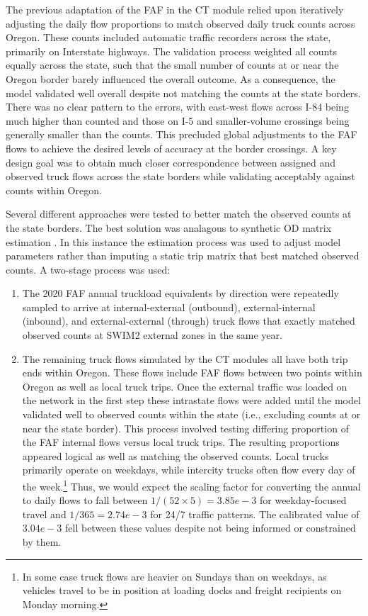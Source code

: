 The previous adaptation of the FAF in the CT module relied upon iteratively adjusting the daily flow proportions to match observed daily truck counts across Oregon. These counts included automatic traffic recorders across the state, primarily on Interstate highways. The validation process weighted all counts equally across the state, such that the small number of counts at or near the Oregon border barely influenced the overall outcome. As a consequence, the model validated well overall despite not matching the counts at the state borders. There was no clear pattern to the errors, with east-west flows across I-84 being much higher than counted and those on I-5 and smaller-volume crossings being generally smaller than the counts. This precluded global adjustments to the FAF flows to achieve the desired levels of accuracy at the border crossings. A key design goal was to obtain much closer correspondence between assigned and observed truck flows across the state borders while validating acceptably against counts within Oregon.

Several different approaches were tested to better match the observed counts at the state borders. The best solution was analagous to synthetic OD matrix estimation \citep{list02, kalahasthi22}. In this instance the estimation process was used to adjust model parameters rather than imputing a static trip matrix that best matched observed counts. A two-stage process was used:
\begin{enumerate}
    \item The 2020 FAF annual truckload equivalents by direction were repeatedly sampled to arrive at internal-external (outbound), external-internal (inbound), and external-external (through) truck flows that exactly matched observed counts at SWIM2 external zones in the same year.
    \item The remaining truck flows simulated by the CT modules all have both trip ends within Oregon. These flows include FAF flows between two points within Oregon as well as local truck trips. Once the external traffic was loaded on the network in the first step these intrastate flows were added until the model validated well to observed counts within the state (i.e., excluding counts at or near the state border). This process involved testing differing proportion of the FAF internal flows versus local truck trips. The resulting proportions appeared logical as well as matching the observed counts. Local trucks primarily operate on weekdays, while intercity trucks often flow every day of the week.\footnote{In some case truck flows are heavier on Sundays than on weekdays, as vehicles travel to be in position at loading docks and freight recipients on Monday morning.} Thus, we would expect the scaling factor for converting the annual to daily flows to fall between $1/(52 \times 5) = 3.85e-3$ for weekday-focused travel and $1/365 = 2.74e-3$ for 24/7 traffic patterns. The calibrated value of $3.04e-3$ fell between these values despite not being informed or constrained by them.
\end{enumerate}

